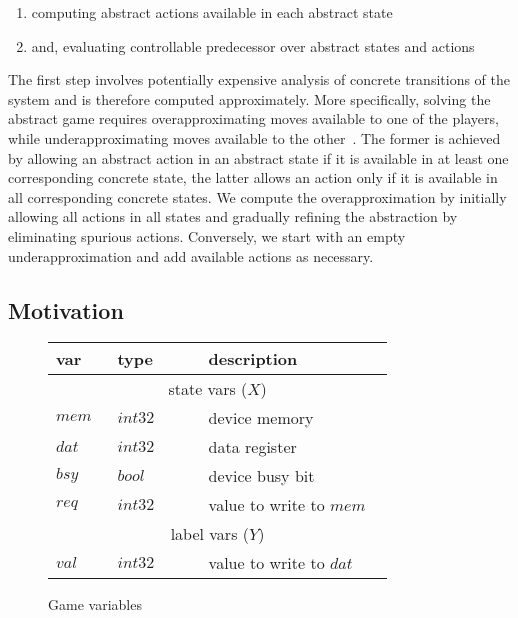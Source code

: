 \begin{enumerate}
    \item computing abstract actions available in each abstract state
    \item and, evaluating controllable predecessor over abstract states and actions
\end{enumerate}

The first step involves potentially expensive analysis of concrete transitions of the system and is therefore computed approximately. More specifically, solving the abstract game requires overapproximating moves available to one of the players, while underapproximating moves available to the other~\cite{Henzinger_JM_03}.  The former is achieved by allowing an abstract action in an abstract state if it is available in at least one corresponding concrete state, the latter allows an action only if it is available in all corresponding concrete states. We compute the overapproximation by initially allowing all actions in all states and gradually refining the abstraction by eliminating spurious actions.  Conversely, we start with an empty underapproximation and add available actions as necessary.

\subsection{Motivation}

\begin{figure}
    \caption{Game variables}
    \begin{tabular}{|p{0.13\linewidth}p{0.22\linewidth}p{0.45\linewidth}|}
        \hline
        {\bf var} & {\bf type} & {\bf description} \\
        \hline\hline
        \multicolumn{3}{|c|}{state vars ($X$)} \\
        \hline
        $mem$ & $int32$ & device memory           \\
        $dat$ & $int32$ & data register           \\
        $bsy$ & $bool$  & device busy bit         \\
        $req$ & $int32$ & value to write to $mem$ \\
        \hline\hline
        \multicolumn{3}{|c|}{label vars ($Y$)}    \\
        \hline
        $val$ & $int32$ & value to write to $dat$ \\
        \hline
    \end{tabular}
\end{figure}

